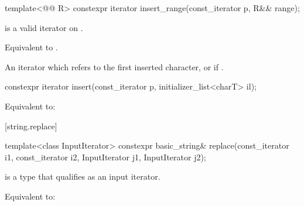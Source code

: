 \documentclass{wg21}
\begin{document}
\begin{addedblock}
\begin{itemdecl}
    template<@@ R>
    constexpr iterator insert_range(const_iterator p, R&& range);
\end{itemdecl}

\begin{itemdescr}
     \pnum
    \expects
     is a valid iterator on .

    \pnum
    \effects
    Equivalent to
    .

    \pnum
    \returns
    An iterator which refers to the first inserted character, or
     if .
\end{itemdescr}
\end{addedblock}

%
\begin{itemdecl}
    constexpr iterator insert(const_iterator p, initializer_list<charT> il);
\end{itemdecl}
\begin{itemdescr}
    \pnum
    \effects Equivalent to: 
\end{itemdescr}

[string.replace]{}

%
\begin{itemdecl}
    template<class InputIterator>
    constexpr basic_string& replace(const_iterator i1, const_iterator i2,
    InputIterator j1, InputIterator j2);
\end{itemdecl}

\begin{itemdescr}
    \pnum
    \constraints
     is a type that qualifies as an input
    iterator.

    \pnum
    \effects
    Equivalent to: 
\end{itemdescr}
\end{document}
